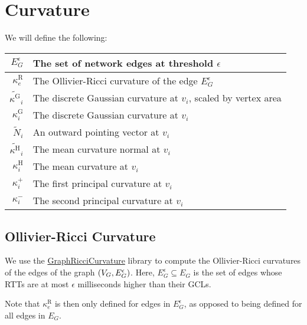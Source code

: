 
\section{Curvature}
We will define the following: \begin{center}\begin{tabular}{r|l}
	\(E_G^\epsilon\) & The set of network edges at threshold \(\epsilon\) \\ \hline
	\(\kappa^\text{R}_e\) & The Ollivier-Ricci curvature of the edge \(E_G^\epsilon\) \\ \hline
	\(\widetilde{\kappa^\text{G}}_i\) & The discrete Gaussian curvature at \(v_i\), scaled by vertex area \\ \hline
	\(\kappa^\text{G}_i\) & The discrete Gaussian curvature at \(v_i\) \\ \hline
	\(\widetilde{N}_i\) & An outward pointing vector at \(v_i\) \\ \hline
	\(\widetilde{\kappa^\text{H}}_i\) & The mean curvature normal at \(v_i\) \\ \hline
	\(\kappa^\text{H}_i\) & The mean curvature at \(v_i\) \\ \hline
	\(\kappa^+_i\) & The first principal curvature at \(v_i\) \\ \hline
	\(\kappa^-_i\) & The second principal curvature at \(v_i\)
\end{tabular}\end{center}

\subsection{Ollivier-Ricci Curvature}
We use the \href{https://github.com/saibalmars/GraphRicciCurvature/}{GraphRicciCurvature} library to compute the Ollivier-Ricci curvatures of the edges of the graph \(\pof{V_G, E_G^\epsilon}\). Here, \(E_G^\epsilon \subseteq E_G\) is the set of edges whose RTTs are at most \(\epsilon\) milliseconds higher than their GCLs.

Note that \(\kappa^\text{R}_e\) is then only defined for edges in \(E_G^\epsilon\), as opposed to being defined for all edges in \(E_G\).

